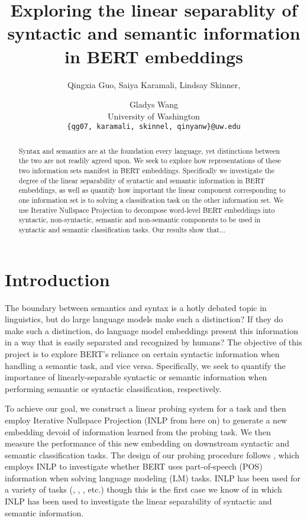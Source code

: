 \documentclass[11pt,a4paper]{article}
\title{Exploring the linear separablity of syntactic and semantic information in BERT embeddings }
\author{Qingxia Guo, Saiya Karamali, Lindsay Skinner, \and Gladys Wang
 \\ University of Washington \\ 
\texttt{\{qg07, karamali, skinnel, qinyanw\}@uw.edu}\\ 
}
\date{}
\begin{document}
\maketitle

\begin{abstract}
Syntax and semantics are at the foundation every language, yet distinctions between the two are not readily agreed upon. We seek to explore how representations of these two information sets manifest in BERT embeddings. Specifically we investigate the degree of the linear separability of syntactic and semantic information in BERT embeddings, as well as quantify how important the linear component corresponding to one information set is to solving a classification task on the other information set. We use Iterative Nullspace Projection to decompose word-level BERT embeddings into syntactic, non-syntactic, semantic and non-semantic components to be used in syntactic and semantic classification tasks. Our results show that...
\end{abstract}



\section{Introduction}
\label{sec:introduction}


The boundary between semantics and syntax is a hotly debated topic in linguistics, but do large language models make such a distinction? If they do make such a distinction, do language model embeddings present this information in a way that is easily separated and recognized by humans? The objective of this project is to explore BERT\rq s \citep{bert} reliance on certain syntactic information when handling a semantic task, and vice versa. Specifically, we seek to quantify the importance of linearly-separable syntactic or semantic information when performing semantic or syntactic classification, respectively. 

To achieve our goal, we construct a linear probing system for a task and then employ Iterative Nullspace Projection (INLP from here on) \citep{inlp} to generate a new embedding devoid of information learned from the probing task. We then measure the performance of this new embedding on downstream syntactic and semantic classification tasks. The design of our probing procedure follows \citep{amnesia}, which employs INLP to investigate whether BERT uses part-of-speech (POS) information when solving language modeling (LM) tasks. INLP has been used for a variety of tasks (\citep{inlp}, \citep{amnesia}, \citep{mbertGreek}, etc.) though this is the first case we know of in which INLP has been used to investigate the linear separability of syntactic and semantic information. 
\end{document}
